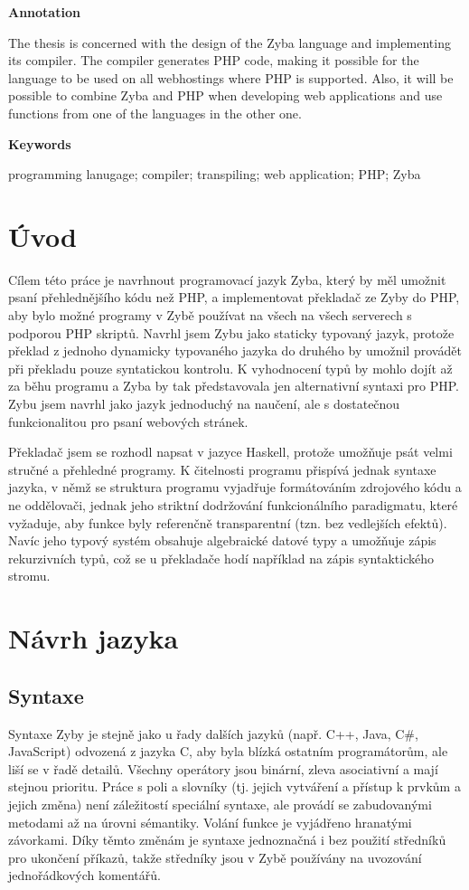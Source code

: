 \documentclass[a4paper,12pt]{article}
\begin{document}
\Large\textbf{Annotation}\normalsize

The thesis is concerned with the design of the Zyba language and implementing its compiler. The compiler generates PHP code, making it possible for the language to be used on all webhostings where PHP is supported. Also, it will be possible to combine Zyba and PHP when developing web applications and use functions from one of the languages in the other one.

\Large\textbf{Keywords}\normalsize

programming lanugage; compiler; transpiling; web application; PHP; Zyba
\newpage
\thispagestyle{empty}
\tableofcontents
\newpage
\section{Úvod}
Cílem této práce je navrhnout programovací jazyk Zyba, který by měl umožnit psaní přehlednějšího kódu než PHP, a implementovat překladač ze Zyby do PHP, aby bylo možné programy v Zybě používat na všech na všech serverech s podporou PHP skriptů. Navrhl jsem Zybu jako staticky typovaný jazyk, protože překlad z jednoho dynamicky typovaného jazyka do druhého by umožnil provádět při překladu pouze syntatickou kontrolu. K vyhodnocení typů by mohlo dojít až za běhu programu a Zyba by tak představovala jen alternativní syntaxi pro PHP. Zybu jsem navrhl jako jazyk jednoduchý na naučení, ale s dostatečnou funkcionalitou pro psaní webových stránek.

Překladač jsem se rozhodl napsat v jazyce Haskell, protože umožňuje psát velmi stručné a přehledné programy. K čitelnosti programu přispívá jednak syntaxe jazyka, v němž se struktura programu vyjadřuje formátováním zdrojového kódu a ne oddělovači, jednak jeho striktní dodržování funkcionálního paradigmatu, které vyžaduje, aby funkce byly referenčně transparentní (tzn. bez vedlejších efektů). Navíc jeho typový systém obsahuje algebraické datové typy a umožňuje zápis rekurzivních typů, což se u překladače hodí například na zápis syntaktického stromu.

\section{Návrh jazyka}
\subsection{Syntaxe}
Syntaxe Zyby je stejně jako u řady dalších jazyků (např. C++, Java, C\#, JavaScript) odvozená z jazyka C, aby byla blízká ostatním programátorům, ale liší se v řadě detailů. Všechny operátory jsou binární, zleva asociativní a mají stejnou prioritu. Práce s poli a slovníky (tj. jejich vytváření a přístup k prvkům a jejich změna) není záležitostí speciální syntaxe, ale provádí se zabudovanými metodami až na úrovni sémantiky. Volání funkce je vyjádřeno hranatými závorkami. Díky těmto změnám je syntaxe jednoznačná i bez použití středníků pro ukončení příkazů, takže středníky jsou v Zybě používány na uvozování jednořádkových komentářů.
\end{document}
